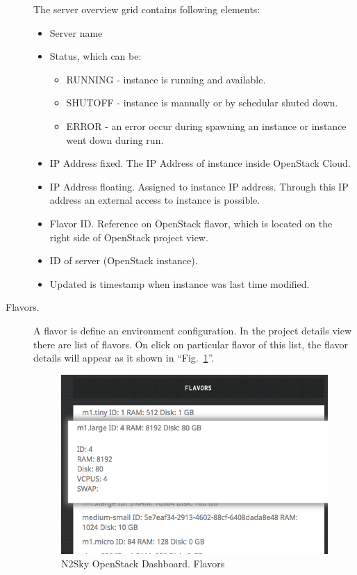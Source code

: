 \begin{description}
The server overview grid contains following elements:
\begin{itemize}
\item Server name 
\item Status, which can be: 
\begin{itemize}
\item RUNNING - instance is running and available. 
\item SHUTOFF - instance is manually or by schedular shuted down. 
\item ERROR - an error occur during spawning an instance or instance went down during run.
\end{itemize}
\item IP Address fixed. The IP Address of instance inside OpenStack Cloud.
\item IP Address floating. Assigned to instance IP address. Through this IP address an external access to instance is possible. 
\item Flavor ID. Reference on OpenStack flavor, which is located on the right side of OpenStack project view.
\item ID of server (OpenStack instance).
\item Updated is timestamp when instance was last time modified. 
\end{itemize}
\item[Flavors.] A flavor is define an environment configuration. In the project details view there are list of flavors. On click on particular flavor of this list, the flavor details will appear as it shown in ``Fig.~\ref{fig:openstack_flavors}''.

 \begin{figure}[htbp]
\begin{center}
  \includegraphics[scale=0.6]{components/4/pics/openstack_flavors.png}
  \caption{N2Sky OpenStack Dashboard. Flavors}
  \label{fig:openstack_flavors}
\end{center}
\end{figure}


\end{description}
